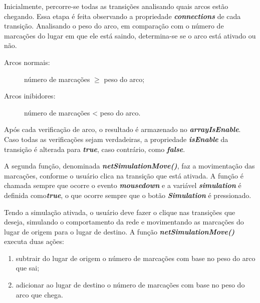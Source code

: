 \documentclass[
	12pt,				%
	openright,			%
	oneside,			%
	a4paper,			%
	english,			%
	brazil				%
	]{abntex2}
\begin{document}


Inicialmente, percorre-se todas as transições analisando quais arcos estão chegando. Essa etapa é feita observando a propriedade \textbf{\textit{connections}} de cada transição. Analisando o peso do arco, em comparação com o número de marcações do lugar em que ele está saindo, determina-se se o arco está ativado ou não.

\begin{description}
	\item[Arcos normais:] número de marcações $\geq$ peso do arco;
	\item[Arcos inibidores:] número de marcações < peso do arco.
\end{description}

Após cada verificação de arco, o resultado é armazenado no \textbf{\textit{arrayIsEnable}}. Caso todas as verificações sejam verdadeiras, a propriedade \textbf{\textit{isEnable}} da transição é alterada para \textbf{\textit{true}}, caso contrário, como \textbf{\textit{false}}. 

A segunda função, denominada \textbf{\textit{netSimulationMove()}}, faz a movimentação das marcações, conforme o usuário clica na transição que está ativada. A função é chamada sempre que ocorre o evento \textbf{\textit{mousedown}} e a variável \textbf{\textit{simulation}} é definida como\textbf{\textit{true}}, o que ocorre sempre que o botão \textbf{\textit{Simulation}} é pressionado.  



Tendo a simulação ativada, o usuário deve fazer o clique nas transições que deseja, simulando o comportamento da rede e movimentando as marcações do lugar de origem para o lugar de destino. A função \textbf{\textit{netSimulationMove()}} executa duas ações: 

\begin{enumerate}
	\item subtrair do lugar de origem o número de marcações com base no peso do arco que sai;
	\item adicionar ao lugar de destino o número de marcações com base no peso do arco que chega.
\end{enumerate}


\end{document}
